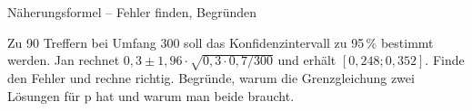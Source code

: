 \begin{aufgabe}{Näherungsformel – Fehler finden, Begründen}
\begin{teile}
\teil Zu 90 Treffern bei Umfang 300 soll das Konfidenzintervall zu 95\,\% bestimmt werden. Jan rechnet $0{,}3 \pm 1{,}96 \cdot \sqrt{0{,}3 \cdot 0{,}7 / 300}$ und erhält $[0{,}248; 0{,}352]$. Finde den Fehler und rechne richtig.
\teil Begründe, warum die Grenzgleichung zwei Lösungen für p hat und warum man beide braucht.
\end{teile}
\end{aufgabe}

